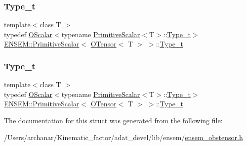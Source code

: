 \subsubsection{\texorpdfstring{Type\_t}{Type\_t}\hspace{0.1cm}{\footnotesize\ttfamily [1/2]}}
{\footnotesize\ttfamily template$<$class T $>$ \\
typedef \mbox{\hyperlink{classENSEM_1_1OScalar}{O\+Scalar}}$<$typename \mbox{\hyperlink{structENSEM_1_1PrimitiveScalar}{Primitive\+Scalar}}$<$T$>$\+::\mbox{\hyperlink{structENSEM_1_1PrimitiveScalar_3_01OTensor_3_01T_01_4_01_4_ac573a5e5194a65a39e552fdebda4994c}{Type\+\_\+t}}$>$ \mbox{\hyperlink{structENSEM_1_1PrimitiveScalar}{E\+N\+S\+E\+M\+::\+Primitive\+Scalar}}$<$ \mbox{\hyperlink{classENSEM_1_1OTensor}{O\+Tensor}}$<$ T $>$ $>$\+::\mbox{\hyperlink{structENSEM_1_1PrimitiveScalar_3_01OTensor_3_01T_01_4_01_4_ac573a5e5194a65a39e552fdebda4994c}{Type\+\_\+t}}}

\mbox{\label{structENSEM_1_1PrimitiveScalar_3_01OTensor_3_01T_01_4_01_4_ac573a5e5194a65a39e552fdebda4994c}} 
\subsubsection{\texorpdfstring{Type\_t}{Type\_t}\hspace{0.1cm}{\footnotesize\ttfamily [2/2]}}
{\footnotesize\ttfamily template$<$class T $>$ \\
typedef \mbox{\hyperlink{classENSEM_1_1OScalar}{O\+Scalar}}$<$typename \mbox{\hyperlink{structENSEM_1_1PrimitiveScalar}{Primitive\+Scalar}}$<$T$>$\+::\mbox{\hyperlink{structENSEM_1_1PrimitiveScalar_3_01OTensor_3_01T_01_4_01_4_ac573a5e5194a65a39e552fdebda4994c}{Type\+\_\+t}}$>$ \mbox{\hyperlink{structENSEM_1_1PrimitiveScalar}{E\+N\+S\+E\+M\+::\+Primitive\+Scalar}}$<$ \mbox{\hyperlink{classENSEM_1_1OTensor}{O\+Tensor}}$<$ T $>$ $>$\+::\mbox{\hyperlink{structENSEM_1_1PrimitiveScalar_3_01OTensor_3_01T_01_4_01_4_ac573a5e5194a65a39e552fdebda4994c}{Type\+\_\+t}}}



The documentation for this struct was generated from the following file\+:\begin{DoxyCompactItemize}
\item 
/\+Users/archanar/\+Kinematic\+\_\+factor/adat\+\_\+devel/lib/ensem/\mbox{\hyperlink{lib_2ensem_2ensem__obstensor_8h}{ensem\+\_\+obstensor.\+h}}\end{DoxyCompactItemize}
